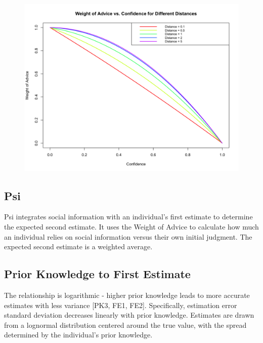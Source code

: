 \documentclass[
  man,floatsintext]{apa6}
\begin{document}
\begin{figure}[H]
\includegraphics[width=5.36in]{photos/woa} \caption{ }\label{fig:unnamed-chunk-3}
\end{figure}

\hypertarget{psi}{%
\subsection{Psi}\label{psi}}

Psi integrates social information with an individual's first estimate to determine the expected second estimate. It uses the Weight of Advice to calculate how much an individual relies on social information versus their own initial judgment. The expected second estimate is a weighted average.

\hypertarget{prior-knowledge-to-first-estimate}{%
\subsection{Prior Knowledge to First Estimate}\label{prior-knowledge-to-first-estimate}}

The relationship is logarithmic - higher prior knowledge leads to more accurate estimates with less variance {[}PK3, FE1, FE2{]}. Specifically, estimation error standard deviation decreases linearly with prior knowledge. Estimates are drawn from a lognormal distribution centered around the true value, with the spread determined by the individual's prior knowledge.
\end{document}
